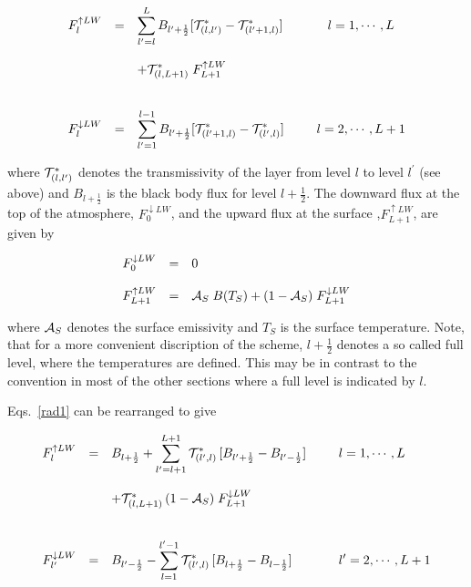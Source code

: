 \begin{equation}\label{rad1}
\begin{array}{rcllcl}
\displaystyle F_l^{\uparrow LW}& = &\displaystyle  \sum\limits_{l^\prime =
l}^{L} B_{l^\prime+\frac{1}{2}} [{\cal T}^*_{(l ,
l^\prime)}-
{\cal T}^*_{(l^\prime+1,l)}] & & \displaystyle \;\; l=1,  \cdots , L\\
&&&&\\
&& \displaystyle +{\cal T}^*_{(l ,L+1)} \; F_{L+1}^{\uparrow LW} & &\\
& & & &\\
&&&&\\
\displaystyle F_l^{\downarrow LW}& = &\displaystyle 
\sum\limits_{l^\prime=1}^{l-
1} B_{l^\prime+\frac{1}{2}} [{\cal T}^*_{(l^\prime+1,l)}-{\cal T}^*_{(l^\prime,l)}]  & & \displaystyle
\;\; l=2,
\cdots , L+1
\end{array}
\end{equation}

where ${\cal T}^*_{(l,l^{\prime})}$ denotes the
transmissivity of
the layer from level $l$ to level $ l^{\prime}$ (see
above)
and $B_{l+\frac{1}{2}}$ is the black body flux for
level
$l+\frac{1}{2}$.  The downward flux at the top of the atmosphere, $F_0^{\downarrow
LW}$, and the upward flux at the surface ,$F_{L+1}^{\uparrow LW}$, are given by

\begin{equation}
\begin{array}{rcl}
\displaystyle F_0^{\downarrow LW} & = & \displaystyle 0 \\
&&\\
\displaystyle F_{L+1}^{\uparrow LW} & = &  \displaystyle {\cal A}_S \; B(T_S) + (1-{\cal A}_S) \;
F_{L+1}^{\downarrow LW} 
\end{array}
\end{equation}

where ${\cal A}_S$ denotes the surface emissivity and $T_S$ is the surface temperature. Note,
that for a more convenient discription of the scheme,
$l+\frac{1}{2}$
denotes a so called full level, where the temperatures
are
defined. This may be in contrast to the convention in
most of the other sections where a full
level is indicated by $l$.

Eqs.~\ref{rad1} can be rearranged to give

\begin{equation}\label{vertical1}
\begin{array}{rclcl}
\displaystyle F_l^{\uparrow LW}& = &\displaystyle  B_{l+\frac{1}{2}} + 
\sum\limits_{l^\prime=l+1}^{L+1} {\cal T}^*_{(l^\prime ,
l)} \,
[B_{l^\prime+\frac{1}{2}} - B_{l^\prime-
\frac{1}{2}}] &  & \displaystyle \;\; l=1,  \cdots , L\\
&&&&\\
 & & + {\cal T}^*_{(l,L+1)} \, (1-{\cal A}_S) \; F_{L+1}^{\downarrow LW} & & \\
& & & &  \\
&&&&\\
\displaystyle F_{l^\prime}^{\downarrow LW}& = & \displaystyle
B_{l^\prime-
\frac{1}{2}} - \sum\limits_{l=1}^{l^\prime-1}{\cal T}^*_{(l^\prime , l)} \,
[B_{l+\frac{1}{2}} -
B_{l-\frac{1}{2}}]
& & \displaystyle \;\; l^\prime=2,  \cdots , L+1
\end{array}
\end{equation}


